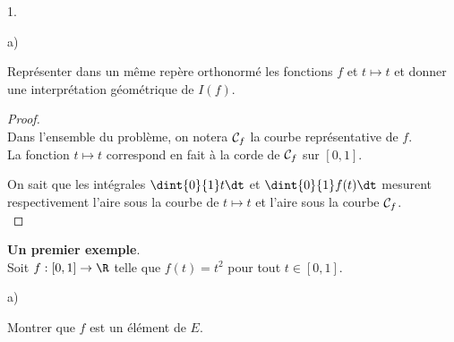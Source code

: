 \documentclass[11pt]{article}%
\begin{document}
\begin{noliste}{1.}
\begin{noliste}{a)}
  
  \item Représenter dans un même repère orthonormé les fonctions $f$ et 
  $t \mapsto t $ et donner une interprétation géométrique de $I(f)$.
  
  \begin{proof}~\\
    Dans l'ensemble du problème, on notera ${\cal C}_f$ la courbe
    représentative de $f$.\\
    La fonction $t\mapsto t$ correspond en fait à la corde de 
    ${\cal C}_f$ sur $[0,1]$. 
    
    \begin{center}
    \shorthandoff{;} 
    \end{center}

  On sait que les intégrales $\dint{0}{1} t\dt$ et $\dint{0}{1} 
  f(t)\dt$ mesurent respectivement l'aire sous la courbe de $t \mapsto 
  t$ et l'aire sous la courbe ${\cal C}_f$. 
  ~\\[-1cm]
  \end{proof}
 \end{noliste}
 
 
 
 \newpage
 
 
 
 \item \textbf{Un premier exemple}.\\
 Soit $f : [0,1] \to \R$ telle que $f(t)= t^2$ pour tout $t \in [0,1]$. 
 \begin{noliste}{a)}
  \setlength{\itemsep}{2mm}
  \item Montrer que $f$ est un élément de $E$.
  

\end{noliste}
\end{noliste}
\end{document}
